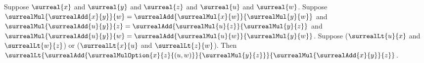 \begin{lemma}\label{surreal_distributive_option_lt_same}
    Suppose $\surreal{x}$ and $\surreal{y}$ and $\surreal{z}$ and
        $\surreal{u}$ and $\surreal{w}$.
    Suppose
        $\surrealMul{\surrealAdd{x}{y}}{w}
            =\surrealAdd{\surrealMul{x}{w}}{\surrealMul{y}{w}}$ and
        $\surrealMul{\surrealAdd{u}{y}}{z}
            =\surrealAdd{\surrealMul{u}{z}}{\surrealMul{y}{z}}$ and
        $\surrealMul{\surrealAdd{u}{y}}{w}
            =\surrealAdd{\surrealMul{u}{w}}{\surrealMul{y}{w}}$.
    Suppose
        ($\surrealLt{u}{x}$ and $\surrealLt{w}{z}$) or
        ($\surrealLt{x}{u}$ and $\surrealLt{z}{w}$).
    Then
        $\surrealLt
            {\surrealAdd{\surrealMulOption{x}{z}{(u,w)}}
                {\surrealMul{y}{z}}}
            {\surrealMul{\surrealAdd{x}{y}}{z}}$.
\end{lemma}
